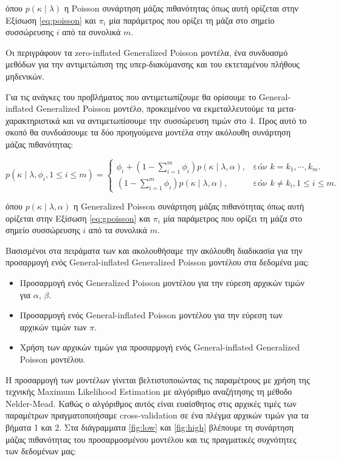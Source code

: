 όπου $p(\kappa \mid \lambda)$ η Poisson συνάρτηση μάζας πιθανότητας όπως αυτή ορίζεται στην Εξίσωση \ref{eq:poisson} και $\pi_i$ μία παράμετρος που ορίζει τη μάζα στο σημείο συσσώρευσης $i$ από τα συνολικά $m$.

Οι \citet{Famoye_onthe} περιγράφουν τα zero-inflated Generalized Poisson μοντέλα, ένα συνδυασμό μεθόδων για την αντιμετώπιση της υπερ-διακύμανσης και του εκτεταμένου πλήθους μηδενικών. 

Για τις ανάγκες του προβλήματος που αντιμετωπίζουμε θα ορίσουμε το General-inflated Genera\-lized Poisson μοντέλο, προκειμένου να εκμεταλλευτούμε τα μετα-χαρακτηριστικά και να αντιμετωπίσουμε την συσσώρευση τιμών στο 4. Προς αυτό το σκοπό θα συνδυάσουμε τα δύο προηγούμενα μοντέλα στην ακόλουθη συνάρτηση μάζας πιθανότητας:

\begin{equation}
 p(\kappa \mid \lambda, \phi_i, 1 \leq i \leq m) = \begin{cases}
 \phi_i + (1-\sum_{i=1}^{m} \phi_i) p(\kappa \mid \lambda, \alpha) , & \text{εάν $k=k_1, \cdots, k_m$}.\\
 (1-\sum_{i=1}^{m} \phi_i) p(\kappa \mid \lambda, \alpha), & \text{εάν $k \neq k_i, 1 \leq i \leq m$}.
 \end{cases}
\end{equation} 
 
 όπου $p(\kappa \mid \lambda, \alpha)$ η Generalized Poisson συνάρτηση μάζας πιθανότητας όπως αυτή ορίζεται στην Εξίσωση \ref{eq:gpoisson} και $\pi_i$ μία παράμετρος που ορίζει τη μάζα στο σημείο συσσώρευσης $i$ από τα συνολικά $m$.
 
 Βασισμένοι στα πειράματα των \citep{gip} και \citep{Famoye_onthe} ακολουθήσαμε την ακόλουθη διαδικασία για την προσαρμογή ενός General-inflated Generalized Poisson μοντέλου στα δεδομένα μας:
 \begin{itemize}
 	\item Προσαρμογή ενός Generalized Poisson μοντέλου για την εύρεση αρχικών τιμών για $\alpha$, $\beta$.
 	\item Προσαρμογή ενός General-inflated Poisson μοντέλου για την εύρεση των αρχικών τιμών των $\pi$.
 	\item Χρήση των αρχικών τιμών για προσαρμογή ενός General-inflated Generalized Poisson μοντέλου.
 \end{itemize}
 
 Η προσαρμογή των μοντέλων γίνεται βελτιστοποιώντας τις παραμέτρους με χρήση της τεχνικής Maximum Likelihood Estimation με αλγόριθμο αναζήτησης τη μέθοδο Nelder-Mead. Καθώς ο αλγόριθμος αυτός είναι ευαίσθητος στις αρχικές τιμές των παραμέτρων πραγματοποιήσαμε cross-validation σε ένα πλέγμα αρχικών τιμών για τα βήματα 1 και 2. Στα διάγραμματα \ref{fig:low} και \ref{fig:high} βλέπουμε τη συνάρτηση μάζας πιθανότητας του προσαρμοσμένου μοντέλου και τις πραγματικές συχνότητες των δεδομένων μας:
 
